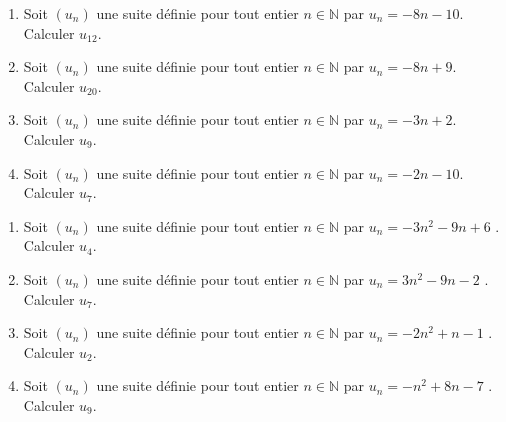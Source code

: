 \documentclass[11pt]{article}
\begin{document}
\begin{exercice}
\begin{enumerate}
	\item Soit $(u_n)$ une suite définie pour tout entier $n\in\mathbb{N}$ par $u_n =-8n-10$. \\Calculer $u_{12}$.
	\item Soit $(u_n)$ une suite définie pour tout entier $n\in\mathbb{N}$ par $u_n =-8n+9$. \\Calculer $u_{20}$.
	\item Soit $(u_n)$ une suite définie pour tout entier $n\in\mathbb{N}$ par $u_n =-3n+2$. \\Calculer $u_{9}$.
	\item Soit $(u_n)$ une suite définie pour tout entier $n\in\mathbb{N}$ par $u_n =-2n-10$. \\Calculer $u_{7}$.
\end{enumerate}
\end{exercice}

\begin{exercice}
\begin{enumerate}
	\item Soit $(u_n)$ une suite définie pour tout entier $n\in\mathbb{N}$ par 
        $u_n = -3n^2-9n+6$  .\\Calculer $u_{4}$.
	\item Soit $(u_n)$ une suite définie pour tout entier $n\in\mathbb{N}$ par 
        $u_n = 3n^2-9n-2$  .\\Calculer $u_{7}$.
	\item Soit $(u_n)$ une suite définie pour tout entier $n\in\mathbb{N}$ par 
        $u_n = -2n^2+n-1$  .\\Calculer $u_{2}$.
	\item Soit $(u_n)$ une suite définie pour tout entier $n\in\mathbb{N}$ par 
        $u_n = -n^2+8n-7$  .\\Calculer $u_{9}$.
\end{enumerate}
\end{exercice}
\end{document}
